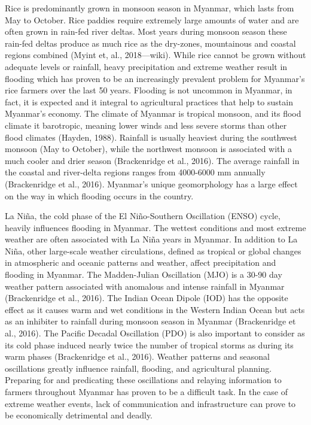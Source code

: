 \documentclass{book}\usepackage{knitr}
\begin{document}
Rice is predominantly grown in monsoon season in Myanmar, which lasts from May to October. Rice paddies require extremely large amounts of water and are often grown in rain-fed river deltas. Most years during monsoon season these rain-fed deltas produce as much rice as the dry-zones, mountainous and coastal regions combined (Myint et, al., 2018—wiki). While rice cannot be grown without adequate levels or rainfall, heavy precipitation and extreme weather result in flooding which has proven to be an increasingly prevalent problem for Myanmar’s rice farmers over the last 50 years.
	Flooding is not uncommon in Myanmar, in fact, it is expected and it integral to agricultural practices that help to sustain Myanmar’s economy. The climate of Myanmar is tropical monsoon, and its flood climate it barotropic, meaning lower winds and less severe storms than other flood climates (Hayden, 1988). Rainfall is usually heaviest during the southwest monsoon (May to October), while the northwest monsoon is associated with a much cooler and drier season (Brackenridge et al., 2016). The average rainfall in the coastal and river-delta regions ranges from 4000-6000 mm annually (Brackenridge et al., 2016). 
	Myanmar’s unique geomorphology has a large effect on the way in which flooding occurs in the country. 
	
La Niña, the cold phase of the El Niño-Southern Oscillation (ENSO) cycle, heavily influences flooding in Myanmar. The wettest conditions and most extreme weather are often associated with La Niña years in Myanmar. In addition to La Niña, other large-scale weather circulations, defined as tropical or global changes in atmospheric and oceanic patterns and weather, affect precipitation and flooding in Myanmar. The Madden-Julian Oscillation (MJO) is a 30-90 day weather pattern associated with anomalous and intense rainfall in Myanmar (Brackenridge et al., 2016).  The Indian Ocean Dipole (IOD) has the opposite effect as it causes warm and wet conditions in the Western Indian Ocean but acts as an inhibiter to rainfall during monsoon season in Myanmar (Brackenridge et al., 2016). The Pacific Decadal Oscillation (PDO) is also important to consider as its cold phase induced nearly twice the number of tropical storms as during its warm phases (Brackenridge et al., 2016). Weather patterns and seasonal oscillations greatly influence rainfall, flooding, and agricultural planning. Preparing for and predicating these oscillations and relaying information to farmers throughout Myanmar has proven to be a difficult task. In the case of extreme weather events, lack of communication and infrastructure can prove to be economically detrimental and deadly. 
\end{document}
